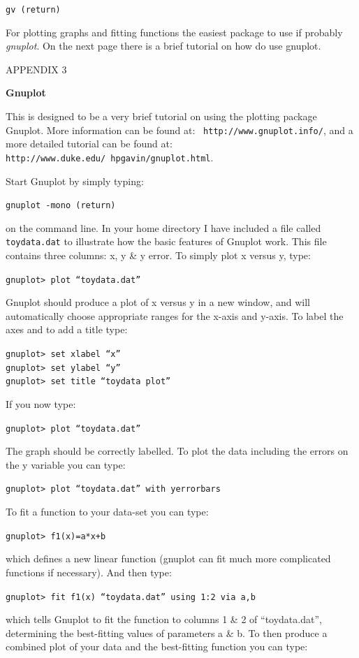 \documentclass[12pt]{article}
\begin{document}
{\tt gv (return)}

For plotting graphs and fitting functions the easiest package to use
if probably {\it gnuplot}. On the next page there is a brief tutorial
on how do use gnuplot.


\newpage
\centerline{\Huge APPENDIX 3}

\begin{center}
{\large{\bf Gnuplot}}
\end{center}
This is designed to be a very brief tutorial on using the plotting
package Gnuplot. More information can be found at: {\tt
http://www.gnuplot.info/}, and a more detailed tutorial can be found
at: {\tt http://www.duke.edu/~hpgavin/gnuplot.html}.

Start Gnuplot by simply typing:

{\tt gnuplot -mono (return)}

on the command line. In your home directory I have included a file
called {\tt toydata.dat} to illustrate how the basic features of
Gnuplot work. This file contains three columns: x, y \& y error. 
To simply plot x versus y, type:

{\tt gnuplot> plot ``toydata.dat''}

Gnuplot should produce a plot of x versus y in a new window, and will
automatically choose appropriate ranges for the x-axis and y-axis. To
label the axes and to add a title type:

{\tt gnuplot> set xlabel ``x''}\\
{\tt gnuplot> set ylabel ``y''}\\
{\tt gnuplot> set title ``toydata plot''}

If you now type:

{\tt gnuplot> plot ``toydata.dat''}

The graph should be correctly labelled. To plot the data including the
errors on the y variable you can type:

{\tt gnuplot> plot ``toydata.dat'' with yerrorbars}

To fit a function to your data-set you can type:

{\tt gnuplot> f1(x)=a*x+b}

which defines a new linear function (gnuplot can fit much more
complicated functions if necessary). And then type:

{\tt gnuplot> fit f1(x) ``toydata.dat'' using 1:2 via a,b}

which tells Gnuplot to fit the function to columns 1 \& 2 of
``toydata.dat'', determining the best-fitting values of parameters a
\& b. To then produce a combined plot of your data and the best-fitting
function you can type:
\end{document}
